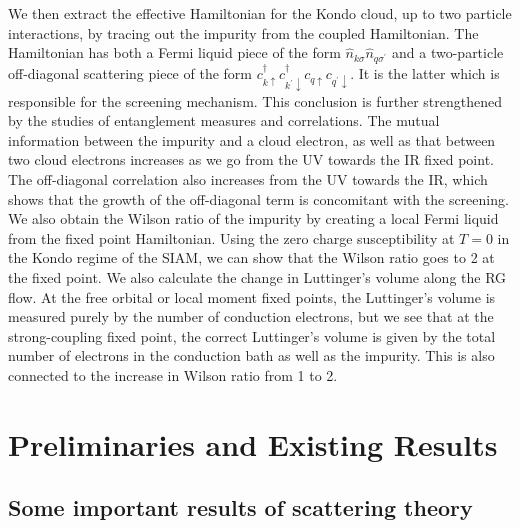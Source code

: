 \documentclass[12pt,twoside]{report}
\numberwithin{equation}{section}
\begin{document}
\pb We then extract the effective Hamiltonian for the Kondo cloud, up to two particle interactions, by tracing out the impurity from the coupled Hamiltonian. The Hamiltonian has both a Fermi liquid piece of the form \(\hat n_{k\sigma}\hat n_{q\sigma^\prime}\) and a two-particle off-diagonal scattering piece of the form \(c^\dagger_{k \uparrow}c^\dagger_{k^\prime \downarrow}c_{q \uparrow}c_{q^\prime \downarrow}\). It is the latter which is responsible for the screening mechanism. This conclusion is further strengthened by the studies of entanglement measures and correlations. The mutual information between the impurity and a cloud electron, as well as that between two cloud electrons increases as we go from the UV towards the IR fixed point. The off-diagonal correlation also increases from the UV towards the IR, which shows that the growth of the off-diagonal term is concomitant with the screening.
\pb We also obtain the Wilson ratio of the impurity by creating a local Fermi liquid from the fixed point Hamiltonian. Using the zero charge susceptibility at \(T=0\) in the Kondo regime of the SIAM, we can show that the Wilson ratio goes to 2 at the fixed point. We also calculate the change in Luttinger's volume along the RG flow. At the free orbital or local moment fixed points, the Luttinger's volume is measured purely by the number of conduction electrons, but we see that at the strong-coupling fixed point, the correct Luttinger's volume is given by the total number of electrons in the conduction bath as well as the impurity. This is also connected to the increase in Wilson ratio from 1 to 2.
\chapter{Preliminaries and Existing Results}\label{prelims}
\section{Some important results of scattering theory}
\end{document}

